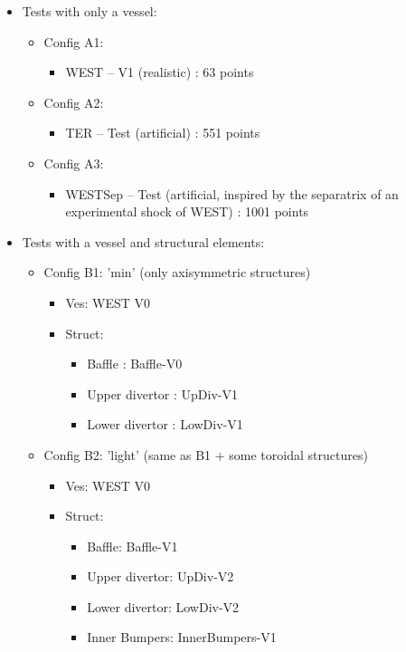 \documentclass[11pt]{amsart}
\begin{document}
\begin{itemize}
	\item Tests with only a vessel:
	\begin{itemize}
		\item  Config A1:
		\begin{itemize}
			\item  WEST -- V1 (realistic) : 63 points
		\end{itemize}
		\item  Config A2:
		\begin{itemize}
			\item  TER -- Test (artificial) : 551 points
		\end{itemize}
		\item  Config A3:
		\begin{itemize}
		\item  WESTSep -- Test (artificial, inspired by the
                  separatrix of an experimental shock of WEST) : 1001 points\\
		\end{itemize}
	\end{itemize}
	\item    Tests with a vessel and structural elements:
	\begin{itemize}
		\item  Config B1: 'min' (only axisymmetric structures)
		\begin{itemize}
			\item  Ves: WEST V0
			\item  Struct:
			\begin{itemize}
				\item      Baffle : Baffle-V0
				\item      Upper divertor : UpDiv-V1
				\item      Lower divertor : LowDiv-V1
			\end{itemize}
		\end{itemize}
	      \item  Config B2: 'light'  (same as B1 + some toroidal
                structures)
		\begin{itemize}
			\item  Ves: WEST V0
			\item  Struct:
			\begin{itemize}
				\item      Baffle: Baffle-V1
				\item      Upper divertor: UpDiv-V2
				\item      Lower divertor: LowDiv-V2
				\item      Inner Bumpers: InnerBumpers-V1

\end{itemize}
\end{itemize}
\end{itemize}
\end{itemize}
\end{document}
